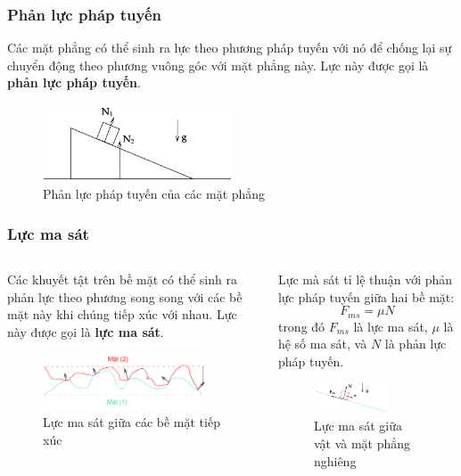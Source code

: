\begin{frame}
    \frametitle{Phản lực pháp tuyến}
Các mặt phẳng có thể sinh ra lực theo phương pháp tuyến với nó để chống lại sự chuyển động theo phương vuông góc với mặt phẳng này. Lực này được gọi là \textbf{phản lực pháp tuyến}.
\begin{figure}
\centering
\includegraphics[width=0.5\textwidth]{Slides/Figure/wedge.png}
\caption{Phản lực pháp tuyến của các mặt phẳng}
\end{figure}
\end{frame}

\begin{frame}
    \frametitle{Lực ma sát}
    \begin{columns}
    \begin{column}{0.5\textwidth}
    Các khuyết tật trên bề mặt có thể sinh ra phản lực theo phương song song với các bề mặt này khi chúng tiếp xúc với nhau. Lực này được gọi là \textbf{lực ma sát}.
    \begin{figure}
        \centering
        \includegraphics[width=0.9\textwidth]{Slides/Figure/friction.png}
        \caption{Lực ma sát giữa các bề mặt tiếp xúc}
    \end{figure}
    \end{column}
    \begin{column}{0.5\textwidth}
    Lực mà sát tỉ lệ thuận với phản lực pháp tuyến giữa hai bề mặt:
    \begin{equation}
        F_{ms} = \mu N
    \end{equation}
    trong đó \(F_{ms}\) là lực ma sát, \(\mu\) là hệ số ma sát, và \(N\) là phản lực pháp tuyến.
    \begin{figure}
        \centering
        \includegraphics[width=0.7\textwidth]{Slides/Figure/slope.png}
        \caption{Lực ma sát giữa vật và mặt phẳng nghiêng}
    \end{figure}
    \end{column}
    \end{columns}
\end{frame}